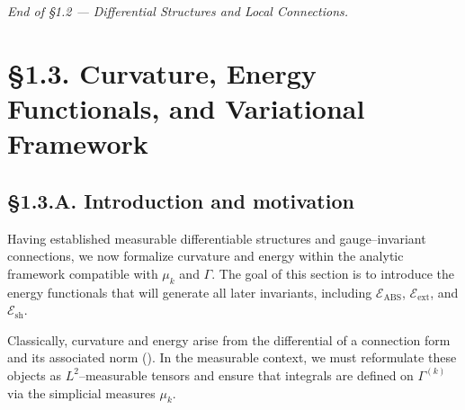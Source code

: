 \begin{center}
\textit{End of §1.2 — Differential Structures and Local Connections.}
\end{center}


\section{§1.3. Curvature, Energy Functionals, and Variational Framework}
\label{sec:1.3-curvature}

\subsection*{§1.3.A. Introduction and motivation}

Having established measurable differentiable structures and gauge–invariant connections, we now formalize curvature and energy within the analytic framework compatible with $\mu_k$ and $\Gamma$.  
The goal of this section is to introduce the energy functionals that will generate all later invariants, including $\mathcal{E}_{\mathrm{ABS}}$, $\mathcal{E}_{\mathrm{ext}}$, and $\mathcal{E}_{\mathrm{sh}}$.

Classically, curvature and energy arise from the differential of a connection form and its associated norm (\cite{KobayashiNomizu,DonaldsonKronheimer}).  
In the measurable context, we must reformulate these objects as $L^2$–measurable tensors and ensure that integrals are defined on $\Gamma^{(k)}$ via the simplicial measures $\mu_k$.

